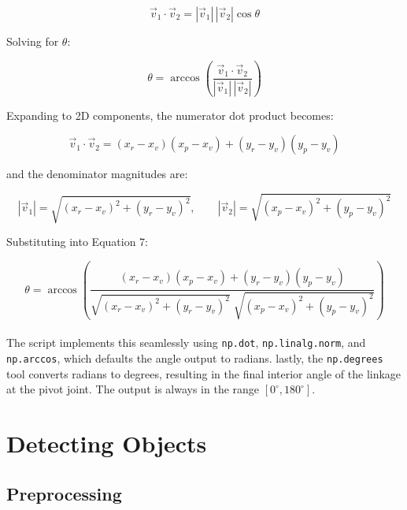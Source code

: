 \documentclass{article}
\begin{document}
\begin{equation}
    \vec{v}_1 \cdot \vec{v}_2 = |\vec{v}_1|\,|\vec{v}_2|\cos\theta
\end{equation}

\noindent Solving for $\theta$:

\begin{equation}
    \theta = \arccos\!\left(\frac{\vec{v}_1 \cdot \vec{v}_2}{|\vec{v}_1|\,|\vec{v}_2|}\right)
    \label{eq:theta}
\end{equation}

\noindent Expanding to 2D components, the numerator dot product becomes:

\begin{equation}
    \vec{v}_1 \cdot \vec{v}_2 = (x_r - x_v)(x_p - x_v) + (y_r - y_v)(y_p - y_v)
\end{equation}

\noindent and the denominator magnitudes are:

\begin{equation}
    |\vec{v}_1| = \sqrt{(x_r - x_v)^2 + (y_r - y_v)^2}, \qquad
    |\vec{v}_2| = \sqrt{(x_p - x_v)^2 + (y_p - y_v)^2}
\end{equation}

\noindent Substituting into Equation 7:

\begin{equation}
    \theta = \arccos\!\left(
        \frac{(x_r - x_v)(x_p - x_v) + (y_r - y_v)(y_p - y_v)}
             {\sqrt{(x_r-x_v)^2+(y_r-y_v)^2}\;\sqrt{(x_p-x_v)^2+(y_p-y_v)^2}}
    \right)
    \label{eq:theta_full}
\end{equation}
\\
\noindent The script implements this seamlessly using \texttt{np.dot}, \texttt{np.linalg.norm}, and \texttt{np.arccos}, which defaults the angle output to radians. lastly, the \texttt{np.degrees} tool converts radians to degrees, resulting in the final interior angle of the linkage at the pivot joint. The output is always in the range $[0^\circ, 180^\circ]$.

\section{Detecting Objects}

\subsection{Preprocessing}
\end{document}
